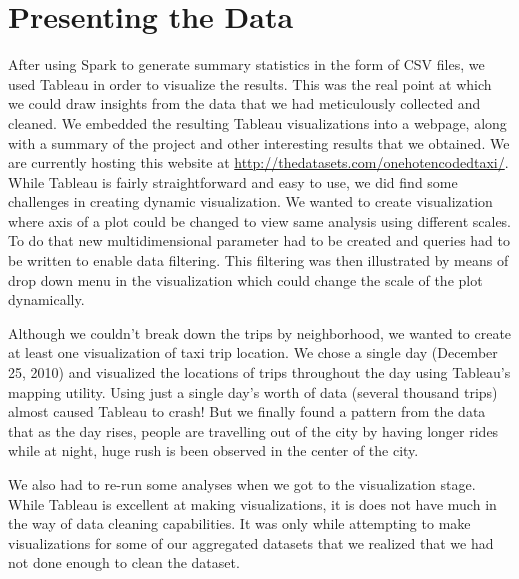 \documentclass[11pt]{article} %
\begin{document}
\section{Presenting the Data}

After using Spark to generate summary statistics in the form of CSV files, we used Tableau in order to visualize the results. This was the real point at which we could draw insights from the data that we had meticulously collected and cleaned. We embedded the resulting Tableau visualizations into a webpage, along with a summary of the project and other interesting results that we obtained. We are currently hosting this website at \url{http://thedatasets.com/onehotencodedtaxi/}. While Tableau is fairly straightforward and easy to use, we did find some challenges in creating dynamic visualization. We wanted to create visualization where axis of a plot could be changed to view same analysis using different scales. To do that new multidimensional parameter had to be created and queries had to be written to enable data filtering. This filtering was then illustrated by means of drop down menu in the visualization which could change the scale of the plot dynamically. 

Although we couldn’t break down the trips by neighborhood, we wanted to create at least one visualization of taxi trip location. We chose a single day (December 25, 2010) and visualized the locations of trips throughout the day using Tableau’s mapping utility. Using just a single day’s worth of data (several thousand trips) almost caused Tableau to crash! But we finally found a pattern from the data that as the day rises, people are travelling out of the city by having longer rides while at night, huge rush is been observed in the center of the city. 

We also had to re-run some analyses when we got to the visualization stage. While Tableau is excellent at making visualizations, it is does not have much in the way of data cleaning capabilities. It was only while attempting to make visualizations for some of our aggregated datasets that we realized that we had not done enough to clean the dataset. 
\end{document}
